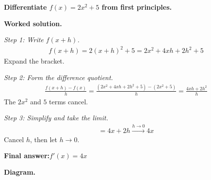 \documentclass[11pt]{article}
\newcommand{\question}[1]{\par\medskip\noindent\textbf{#1}\par}
\begin{document}
\question{Differentiate \( f(x) = 2x^2 + 5 \) from first principles.}

\textbf{Worked solution.}

\textit{Step 1: Write \( f(x+h) \).}
\[\begin{gathered}
f(x+h) = 2(x+h)^2 + 5 = 2x^2 + 4xh + 2h^2 + 5
\end{gathered}\]
Expand the bracket.

\textit{Step 2: Form the difference quotient.}
\[\begin{gathered}
\frac{f(x+h) - f(x)}{h} = \frac{(2x^2 + 4xh + 2h^2 + 5) - (2x^2 + 5)}{h} = \frac{4xh + 2h^2}{h}
\end{gathered}\]
The \( 2x^2 \) and \( 5 \) terms cancel.

\textit{Step 3: Simplify and take the limit.}
\[\begin{gathered}
= 4x + 2h \xrightarrow{h \to 0} 4x
\end{gathered}\]
Cancel \( h \), then let \( h \to 0 \).

\begin{answerbox}
\textbf{Final answer:}\quad \(\displaystyle  f'(x) = 4x \)
\end{answerbox}
\textbf{Diagram.}
\end{document}
